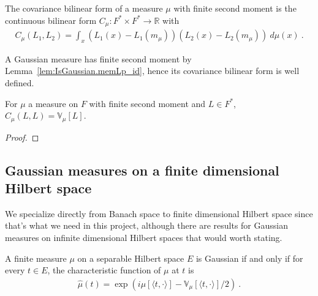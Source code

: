 \begin{definition}[Covariance]\label{def:covarianceBilin}
  \mathlibok
The covariance bilinear form of a measure $\mu$ with finite second moment is the continuous bilinear form $C_\mu : F^* \times F^* \to \mathbb{R}$ with
\begin{align*}
  C_\mu(L_1, L_2) = \int_x (L_1(x) - L_1(m_\mu)) (L_2(x) - L_2(m_\mu)) \: d\mu(x) \: .
\end{align*}
\end{definition}

A Gaussian measure has finite second moment by Lemma~\ref{lem:IsGaussian.memLp_id}, hence its covariance bilinear form is well defined.

\begin{lemma}\label{lem:covarianceBilin_same_eq_variance}
  \mathlibok
For $\mu$ a measure on $F$ with finite second moment and $L \in F^*$, $C_\mu(L, L) = \mathbb{V}_\mu[L]$.
\end{lemma}

\begin{proof}\leanok

\end{proof}


\subsection{Gaussian measures on a finite dimensional Hilbert space}

We specialize directly from Banach space to finite dimensional Hilbert space since that's what we need in this project, although there are results for Gaussian measures on infinite dimensional Hilbert spaces that would worth stating.

\begin{lemma}\label{lem:isGaussian_iff_charFunDual_inner_eq}
A finite measure $\mu$ on a separable Hilbert space $E$ is Gaussian if and only if for every $t \in E$, the characteristic function of $\mu$ at $t$ is
\begin{align*}
  \hat{\mu}(t) =  \exp\left(i \mu[\langle t, \cdot \rangle] - \mathbb{V}_\mu[\langle t, \cdot \rangle] / 2\right) \: .
\end{align*}
\end{lemma}

